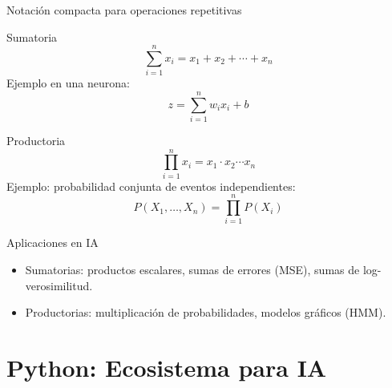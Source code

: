 \documentclass[aspectratio=169, 10pt, xcolor=table]{beamer}
\begin{document}
\begin{frame}{Notación compacta para operaciones repetitivas}
    \begin{block}{Sumatoria}
        \[
        \sum_{i=1}^{n} x_i = x_1 + x_2 + \cdots + x_n
        \]
        Ejemplo en una neurona:
        \[
        z = \sum_{i=1}^{n} w_i x_i + b
        \]
    \end{block}
    \begin{block}{Productoria}
        \[
        \prod_{i=1}^{n} x_i = x_1 \cdot x_2 \cdots x_n
        \]
        Ejemplo: probabilidad conjunta de eventos independientes:
        \[
        P(X_1,\dots,X_n) = \prod_{i=1}^{n} P(X_i)
        \]
    \end{block}
\end{frame}

\begin{frame}{Aplicaciones en IA}
    \begin{itemize}
        \item Sumatorias: productos escalares, sumas de errores (MSE), sumas de log-verosimilitud.
        \item Productorias: multiplicación de probabilidades, modelos gráficos (HMM).
    \end{itemize}
\end{frame}

\section{Python: Ecosistema para IA}
\end{document}
